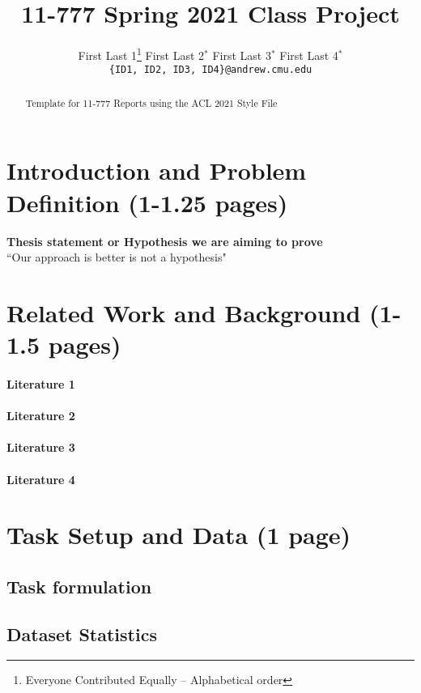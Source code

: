 \documentclass[11pt,a4paper]{article}
\title{11-777 Spring 2021 Class Project}
\author{
  First Last 1\thanks{\hspace{4pt}Everyone Contributed Equally -- Alphabetical order} \hspace{2em} First Last 2$^*$ \hspace{2em} First Last 3$^*$ \hspace{2em} First Last 4$^*$ \\
  \texttt{\{ID1, ID2, ID3, ID4\}@andrew.cmu.edu}
  }
\date{}
\begin{document}
\maketitle
\begin{abstract}
Template for 11-777 Reports using the ACL 2021 Style File 
\end{abstract}

\section{Introduction and Problem Definition (1-1.25 pages)}
\textbf{Thesis statement or Hypothesis we are aiming to prove}\\
``Our approach is better is not a hypothesis"
\begin{figure}
\end{figure}

\clearpage
\section{Related Work and Background (1-1.5 pages)}
\paragraph{Literature 1}
\paragraph{Literature 2}
\paragraph{Literature 3}
\paragraph{Literature 4}

\clearpage
\section{Task Setup and Data (1 page)}
\subsection{Task formulation}
\subsection{Dataset Statistics}
\end{document}
